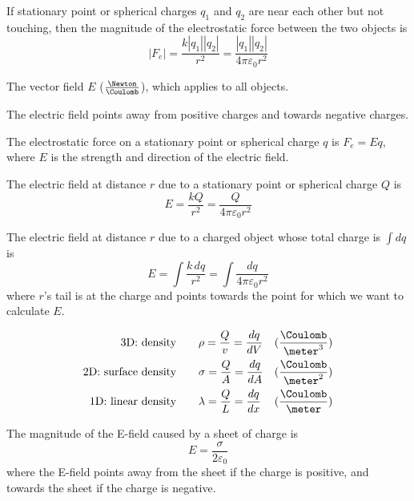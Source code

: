 \begin{namedlaw}
  If stationary point or spherical charges $q_1$ and $q_2$ are near each other but not touching, then the magnitude of the electrostatic force between the two objects is
  \[
    |F_e| = \frac{k |q_1| |q_2|}{r^2} = \frac{|q_1| |q_2|}{4 \pi \varepsilon_0 r^2}
  \]
\end{namedlaw}

\begin{definition}
  The vector field $E$ ($\frac{\Newton}{\Coulomb}$), which applies to all objects.

  The electric field points away from positive charges and towards negative charges.
\end{definition}

\begin{law}
  The electrostatic force on a stationary point or spherical charge $q$ is $F_e = Eq$, where $E$ is the strength and direction of the electric field.
\end{law}

\begin{law}
  The electric field at distance $r$ due to a stationary point or spherical charge $Q$ is
  \[
    E = \frac{kQ}{r^2} = \frac{Q}{4\pi\varepsilon_0 r^2}
  \]

  The electric field at distance $r$ due to a charged object whose total charge is $\int dq$ is
  \[
    E = \int \frac{k \,dq}{r^2} = \int \frac{dq}{4 \pi \varepsilon_0 r^2}
  \]
  where $r$'s tail is at the charge and points towards the point for which we want to calculate $E$.
\end{law}

\begin{definition}
  \begin{align*}
    \text{3D: density} \qquad & \rho = \frac{Q}{v} = \frac{dq}{dV} & (\frac{\Coulomb}{\meter^3}) \\
    \text{2D: surface density} \qquad & \sigma = \frac{Q}{A} = \frac{dq}{dA} & (\frac{\Coulomb}{\meter^2}) \\
    \text{1D: linear density} \qquad & \lambda = \frac{Q}{L} = \frac{dq}{dx} & (\frac{\Coulomb}{\meter}) \\
  \end{align*}
\end{definition}

\begin{example}
  The magnitude of the E-field caused by a sheet of charge is
  \[
    E = \frac{\sigma}{2\varepsilon_0}
  \]
  where the E-field points away from the sheet if the charge is positive, and towards the sheet if the charge is negative.
\end{example}


